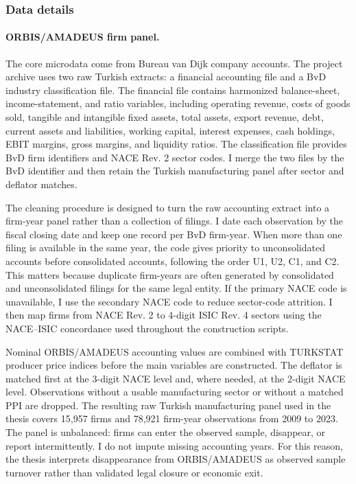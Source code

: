 ﻿\documentclass[12pt]{article}
\begin{document}
\subsubsection{Data details}

\paragraph{ORBIS/AMADEUS firm panel.}\hfill\par
\noindent The core microdata come from Bureau van Dijk company accounts. The project archive uses two raw Turkish extracts: a financial accounting file and a BvD industry classification file. The financial file contains harmonized balance-sheet, income-statement, and ratio variables, including operating revenue, costs of goods sold, tangible and intangible fixed assets, total assets, export revenue, debt, current assets and liabilities, working capital, interest expenses, cash holdings, EBIT margins, gross margins, and liquidity ratios. The classification file provides BvD firm identifiers and NACE Rev. 2 sector codes. I merge the two files by the BvD identifier and then retain the Turkish manufacturing panel after sector and deflator matches.

The cleaning procedure is designed to turn the raw accounting extract into a firm-year panel rather than a collection of filings. I date each observation by the fiscal closing date and keep one record per BvD firm-year. When more than one filing is available in the same year, the code gives priority to unconsolidated accounts before consolidated accounts, following the order U1, U2, C1, and C2. This matters because duplicate firm-years are often generated by consolidated and unconsolidated filings for the same legal entity. If the primary NACE code is unavailable, I use the secondary NACE code to reduce sector-code attrition. I then map firms from NACE Rev. 2 to 4-digit ISIC Rev. 4 sectors using the NACE--ISIC concordance used throughout the construction scripts.

Nominal ORBIS/AMADEUS accounting values are combined with TURKSTAT producer price indices before the main variables are constructed. The deflator is matched first at the 3-digit NACE level and, where needed, at the 2-digit NACE level. Observations without a usable manufacturing sector or without a matched PPI are dropped. The resulting raw Turkish manufacturing panel used in the thesis covers 15,957 firms and 78,921 firm-year observations from 2009 to 2023. The panel is unbalanced: firms can enter the observed sample, disappear, or report intermittently. I do not impute missing accounting years. For this reason, the thesis interprets disappearance from ORBIS/AMADEUS as observed sample turnover rather than validated legal closure or economic exit.
\end{document}
